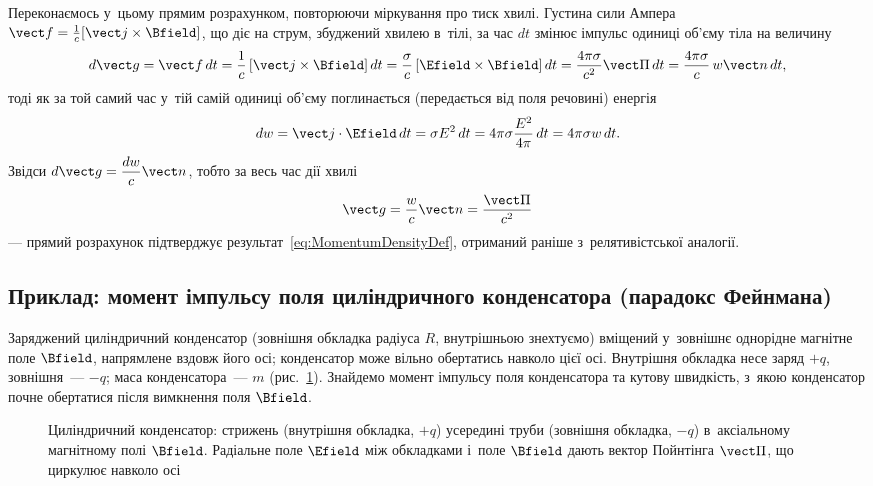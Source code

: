 Переконаємось у~цьому прямим розрахунком, повторюючи міркування про тиск хвилі. Густина сили Ампера $\vect f = \tfrac1c[\vect j\times\Bfield]$, що діє
на струм, збуджений хвилею в~тілі, за час $dt$ змінює імпульс одиниці об'єму тіла на величину
\begin{equation*}
	d\vect g = \vect f\, dt = \frac1c\left[\vect j\times\Bfield\right]dt = \frac\sigma c\left[\Efield\times\Bfield\right]dt =
	\frac{4\pi\sigma}{c^2}\vect\Pi\, dt = \frac{4\pi\sigma}c\, w\vect n\, dt,
\end{equation*}
тоді як за той самий час у~тій самій одиниці об'єму поглинається (передається від поля речовині) енергія
\begin{equation*}
	dw = \vect j\cdot\Efield\, dt = \sigma E^2\, dt = 4\pi\sigma\frac{E^2}{4\pi}\, dt = 4\pi\sigma w\, dt.
\end{equation*}
Звідси $d\vect g = \dfrac{dw}{c}\vect n$, тобто за весь час дії хвилі
\begin{equation}\label{eq:MomentumDerivation}
	\vect g = \frac{w}c\vect n = \frac{\vect\Pi}{c^2}
\end{equation}
--- прямий розрахунок підтверджує результат~\eqref{eq:MomentumDensityDef}, отриманий раніше з~релятивістської аналогії.

\subsection*{Приклад: момент імпульсу поля циліндричного конденсатора (парадокс Фейнмана)}

Заряджений циліндричний конденсатор (зовнішня обкладка радіуса $R$, внутрішньою знехтуємо) вміщений у~зовнішнє однорідне магнітне поле
$\Bfield$, напрямлене вздовж його осі; конденсатор може вільно обертатись навколо цієї осі. Внутрішня обкладка несе заряд $+q$, зовнішня~--- $-q$; маса конденсатора~--- $m$
(рис.~\ref{pic:CapacitorAngularMomentum}). Знайдемо момент імпульсу поля конденсатора та кутову швидкість, з~якою конденсатор почне обертатися
після вимкнення поля $\Bfield$.

\begin{figure}[h!]\centering
	\caption{Циліндричний конденсатор: стрижень (внутрішня обкладка, $+q$) усередині труби (зовнішня обкладка, $-q$) в~аксіальному
		магнітному полі $\Bfield$. Радіальне поле $\Efield$ між обкладками і~поле $\Bfield$ дають вектор Пойнтінга $\vect\Pi$, що циркулює навколо осі\label{pic:CapacitorAngularMomentum}}
\end{figure}


